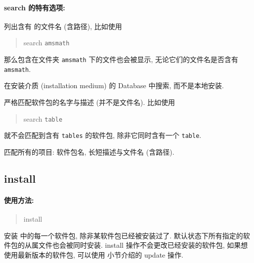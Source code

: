 \paragraph{{\mdseries\ac{search}} 的特有选项:}
\begin{description}
    \item {}\par
    列出含有  的文件名 (含路径), 比如使用
    \begin{quote}
        \tlmgr{} \ac{search}  \texttt{amsmath}
    \end{quote} 
    那么包含在文件夹 \texttt{amsmath} 下的文件也会被显示, 无论它们的文件名是否含有 \texttt{amsmath}. 
    \item {}\par
    在安装介质 (installation medium) 的 \tl{} Database 中搜索, 而不是本地安装. 
    \item {}\par
    严格匹配软件包的名字与描述 (并不是文件名). 比如使用
    \begin{quote}
        \tlmgr{} \ac{search}  \texttt{table}
    \end{quote}
    就不会匹配到含有 \texttt{tables} 的软件包, 除非它同时含有一个 \texttt{table}.
    \item {}\par
    匹配所有的项目: 软件包名, 长短描述与文件名 (含路径). 
\end{description}

\clearpage

\subsection{\mdseries\ac{install}}
\paragraph{使用方法:}
\begin{quote}
    \tlmgr{} \ac{install} 
\end{quote}

安装  中的每一个软件包, 除非某软件包已经被安装过了. 默认状态下所有指定的软件包的从属文件也会被同时安装. \ac{install} 操作不会更改已经安装的软件包, 如果想使用最新版本的软件包, 可以使用  小节介绍的 \ac{update} 操作. 

